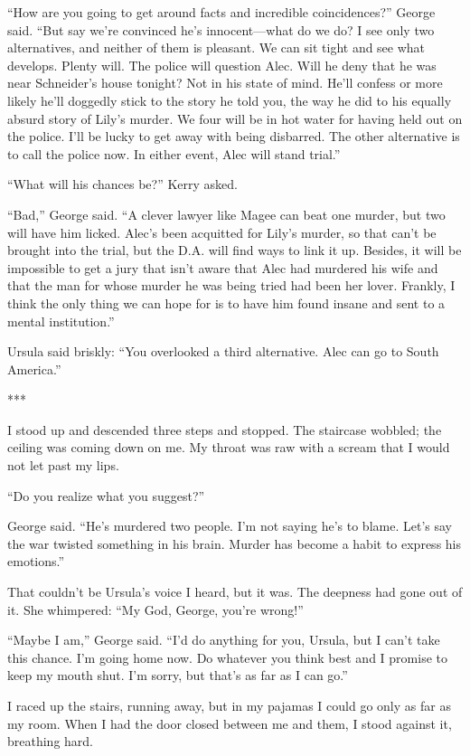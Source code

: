 \documentclass{novel}
\begin{document}
{“How are you going to get around facts and incredible coincidences?” George said. “But say we’re convinced he’s innocent—what do we do? I see only two alternatives, and neither of them is pleasant. We can sit tight and see what develops. Plenty will. The police will question Alec. Will he deny that he was near Schneider’s house tonight? Not in his state of mind. He’ll confess or more likely he’ll doggedly stick to the story he told you, the way he did to his equally absurd story of Lily’s murder. We four will be in hot water for having held out on the police. I’ll be lucky to get away with being disbarred. The other alternative is to call the police now. In either event, Alec will stand trial.”

“What will his chances be?” Kerry asked.

“Bad,” George said. “A clever lawyer like Magee can beat one murder, but two will have him licked. Alec’s been acquitted for Lily’s murder, so that can’t be brought into the trial, but the D.A. will find ways to link it up. Besides, it will be impossible to get a jury that isn’t aware that Alec had murdered his wife and that the man for whose murder he was being tried had been her lover. Frankly, I think the only thing we can hope for is to have him found insane and sent to a mental institution.”

Ursula said briskly: “You overlooked a third alternative. Alec can go to South America.”

***

I stood up and descended three steps and stopped. The staircase wobbled; the ceiling was coming down on me. My throat was raw with a scream that I would not let past my lips.

“Do you realize what you suggest?”

George said. “He’s murdered two people. I’m not saying he’s to blame. Let’s say the war twisted something in his brain. Murder has become a habit to express his emotions.”

That couldn’t be Ursula’s voice I heard, but it was. The deepness had gone out of it. She whimpered: “My God, George, you’re wrong!”

“Maybe I am,” George said. “I’d do anything for you, Ursula, but I can’t take this chance. I’m going home now. Do whatever you think best and I promise to keep my mouth shut. I’m sorry, but that’s as far as I can go.”

I raced up the stairs, running away, but in my pajamas I could go only as far as my room. When I had the door closed between me and them, I stood against it, breathing hard.

}
\end{document}

